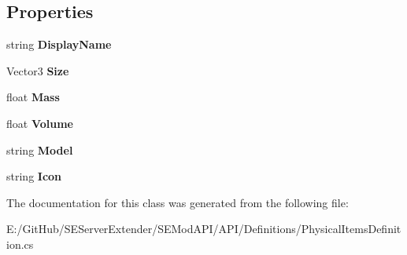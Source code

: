 \subsection*{Properties}
\begin{DoxyCompactItemize}
\item 
\hypertarget{class_s_e_mod_a_p_i_1_1_a_p_i_1_1_definitions_1_1_physical_items_definition_a5963b347b40ad805c7e13ac274a26076}{}string {\bfseries Display\+Name}\label{class_s_e_mod_a_p_i_1_1_a_p_i_1_1_definitions_1_1_physical_items_definition_a5963b347b40ad805c7e13ac274a26076}

\item 
\hypertarget{class_s_e_mod_a_p_i_1_1_a_p_i_1_1_definitions_1_1_physical_items_definition_a94d0a76552d958618a4abb8dfa4f6008}{}Vector3 {\bfseries Size}\label{class_s_e_mod_a_p_i_1_1_a_p_i_1_1_definitions_1_1_physical_items_definition_a94d0a76552d958618a4abb8dfa4f6008}

\item 
\hypertarget{class_s_e_mod_a_p_i_1_1_a_p_i_1_1_definitions_1_1_physical_items_definition_a9ae4336e6fc010aa0794c1ea2a9ff11b}{}float {\bfseries Mass}\label{class_s_e_mod_a_p_i_1_1_a_p_i_1_1_definitions_1_1_physical_items_definition_a9ae4336e6fc010aa0794c1ea2a9ff11b}

\item 
\hypertarget{class_s_e_mod_a_p_i_1_1_a_p_i_1_1_definitions_1_1_physical_items_definition_a6b23aa6be7d84388e71d63d623323a77}{}float {\bfseries Volume}\label{class_s_e_mod_a_p_i_1_1_a_p_i_1_1_definitions_1_1_physical_items_definition_a6b23aa6be7d84388e71d63d623323a77}

\item 
\hypertarget{class_s_e_mod_a_p_i_1_1_a_p_i_1_1_definitions_1_1_physical_items_definition_a4917d370b76e02e34e1581e78e9a33b7}{}string {\bfseries Model}\label{class_s_e_mod_a_p_i_1_1_a_p_i_1_1_definitions_1_1_physical_items_definition_a4917d370b76e02e34e1581e78e9a33b7}

\item 
\hypertarget{class_s_e_mod_a_p_i_1_1_a_p_i_1_1_definitions_1_1_physical_items_definition_a6c3a2ef2776d2385b39e83409fefef93}{}string {\bfseries Icon}\label{class_s_e_mod_a_p_i_1_1_a_p_i_1_1_definitions_1_1_physical_items_definition_a6c3a2ef2776d2385b39e83409fefef93}

\end{DoxyCompactItemize}


The documentation for this class was generated from the following file\+:\begin{DoxyCompactItemize}
\item 
E\+:/\+Git\+Hub/\+S\+E\+Server\+Extender/\+S\+E\+Mod\+A\+P\+I/\+A\+P\+I/\+Definitions/Physical\+Items\+Definition.\+cs\end{DoxyCompactItemize}
